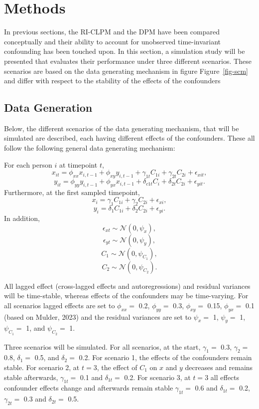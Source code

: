 \documentclass[
]{interact}
\begin{document}
\hypertarget{methods}{%
\section{Methods}\label{methods}}

In previous sections, the RI-CLPM and the DPM have been compared
conceptually and their ability to account for unobserved time-invariant
confounding has been touched upon. In this section, a simulation study
will be presented that evaluates their performance under three different
scenarios. These scenarios are based on the data generating mechanism in
figure Figure~\ref{fig-scm} and differ with respect to the stability of
the effects of the confounders

\hypertarget{data-generation}{%
\subsection{Data Generation}\label{data-generation}}

Below, the different scenarios of the data generating mechanism, that
will be simulated are described, each having different effects of the
confounders. These all follow the following general data generating
mechanism:

For each person \(i\) at timepoint \(t\), \[
x_{it} = \phi_{xx}x_{i,t-1} + \phi_{xy}y_{i,t-1} + \gamma_{1t}C_{1i} + \gamma_{2t}C_{2i} + \epsilon_{xit},
\] \[
y_{it} = \phi_{yy}y_{i,t-1} + \phi_{yx}x_{i,t-1} + \delta_{c1t}C_{i} + \delta_{2t}C_{2i} + \epsilon_{yit}.
\] Furthermore, at the first sampled timepoint, \[
x_{i} = \gamma_{1}C_{1i} + \gamma_{2}C_{2i} + \epsilon_{xi},
\] \[
y_{i} = \delta_{1}C_{1i} + \delta_{2}C_{2i} + \epsilon_{yi}.
\] In addition, \[
\epsilon_{xt} \sim \mathcal{N}(0, \psi_x),
\] \[
\epsilon_{yt} \sim \mathcal{N}(0, \psi_y),
\] \[
C_{1} \sim \mathcal{N}(0, \psi_{C_1}),
\] \[
C_{2} \sim \mathcal{N}(0, \psi_{C_2}).
\]

All lagged effect (cross-lagged effects and autoregressions) and
residual variances will be time-stable, whereas effects of the
confounders may be time-varying. For all scenarios lagged effects are
set to \(\phi_{xx} =\) 0.2, \(\phi_{yy} =\) 0.3, \(\phi_{xy} =\) 0.15,
\(\phi_{yx} =\) 0.1 (based on Mulder, 2023) and the residual variances
are set to \(\psi_x =\) 1, \(\psi_y =\) 1, \(\psi_{C_1} =\) 1, and
\(\psi_{C_2} =\) 1.

Three scenarios will be simulated. For all scenarios, at the start,
\(\gamma_{1} =\) 0.3, \(\gamma_{2} =\) 0.8, \(\delta_{1} =\) 0.5, and
\(\delta_{2} =\) 0.2. For scenario 1, the effects of the confounders
remain stable. For scenario 2, at \(t=3\), the effect of \(C_1\) on
\(x\) and \(y\) decreases and remains stable afterwards,
\(\gamma_{1t} =\) 0.1 and \(\delta_{1t} =\) 0.2. For scenario 3, at
\(t=3\) all effects confounder effects change and afterwards remain
stable \(\gamma_{1t} =\) 0.6 and \(\delta_{1t} =\) 0.2,
\(\gamma_{2t} =\) 0.3 and \(\delta_{2t} =\) 0.5.
\end{document}
